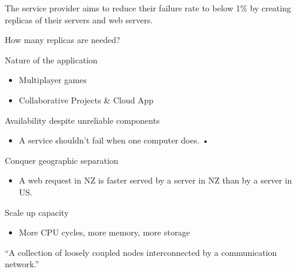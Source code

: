 \begin{slide}
    

    The service provider aims to reduce their failure rate to below 1\% by creating replicas of their servers and web servers.
    \bigskip

    How many replicas are needed?

\end{slide}

\begin{slide}


    Nature of the application
    \begin{itemize}
        \item Multiplayer games
        \item Collaborative Projects \& Cloud App
    \end{itemize}
    \bigskip

    Availability despite unreliable components 
    \begin{itemize}
        \item A service shouldn’t fail when one computer does. • 
    \end{itemize}
    \bigskip

    Conquer geographic separation 
    \begin{itemize}
        \item A web request in NZ is faster served by a server in NZ than by a server in US.
    \end{itemize}
    \bigskip

    Scale up capacity 
    \begin{itemize}
        \item More CPU cycles, more memory, more storage
    \end{itemize}

\end{slide}

\begin{slide}


    \begin{exampleblock}{}
          {\large ``A collection of loosely coupled nodes interconnected by a communication network.''}
            \vskip5mm
              \hspace*{}
    \end{exampleblock}

\end{slide}

